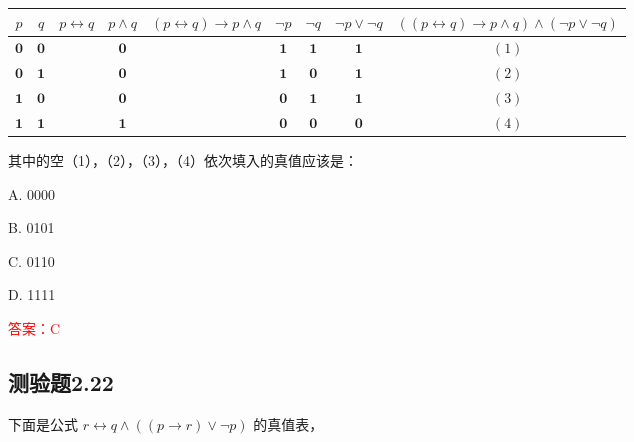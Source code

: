 \documentclass[UTF8, heading=true]{ctexart}
\begin{document}
\clearpage

\begin{table}[H]
  \centering
  \renewcommand{\arraystretch}{1.2}
\begin{tabular}{c|c|c|c|c|c|c|c|c}
\hline$p$ & $q$ & $p \leftrightarrow q$ & $p \wedge q$ & $(p \leftrightarrow q) \rightarrow p \wedge q$ & $\neg p$ & $\neg q$ & $\neg p \vee \neg q$ & $((p \leftrightarrow q) \rightarrow p \wedge q) \wedge(\neg p \vee \neg q)$ \\
\hline $\mathbf{0}$ & $\mathbf{0}$ & & $\mathbf{0}$ & & $\mathbf{1}$ & $\mathbf{1}$ & $\mathbf{1}$ & ${(1)}$ \\
\hline $\mathbf{0}$ & $\mathbf{1}$ & & $\mathbf{0}$ & & $\mathbf{1}$ & $\mathbf{0}$ & $\mathbf{1}$ & $(2)$ \\
\hline $\mathbf{1}$ & $\mathbf{0}$ & & $\mathbf{0}$ & & $\mathbf{0}$ & $\mathbf{1}$ & $\mathbf{1}$ & ${(3)}$ \\
\hline $\mathbf{1}$ & $\mathbf{1}$ & & $\mathbf{1}$ & & $\mathbf{0}$ & $\mathbf{0}$ & $\mathbf{0}$ & ${(4)}$ \\
\hline
\end{tabular}
\end{table}

其中的空（1），（2），（3），（4）依次填入的真值应该是： $\qquad$


A. 0000

B. 0101

C. 0110

D. 1111

\textcolor{red}{答案：C}

\subsection{测验题2.22}

下面是公式 $r \leftrightarrow q \wedge((p \rightarrow r) \vee \neg p)$ 的真值表，
\end{document}
